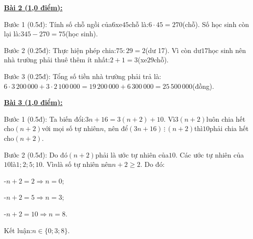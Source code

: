 \documentclass[11pt,a4paper]{article}
\begin{document}
\noindent\textbf{\underline{Bài 2 (1,0 điểm):}}\par\vspace{3pt}
Bước 1 (0.5đ): Tính số chỗ ngồi của$6$xe$45$chỗ là:$6 \cdot 45 = 270$(chỗ). Số học sinh còn lại là:$345 - 270 = 75$(học sinh).\par\noindent Bước 2 (0.25đ): Thực hiện phép chia:$75 : 29 = 2$(dư 17). Vì còn dư$17$học sinh nên nhà trường phải thuê thêm ít nhất:$2 + 1 = 3$(xe$29$chỗ).\par\noindent Bước 3 (0.25đ): Tổng số tiền nhà trường phải trả là:$6 \cdot 3\,200\,000 + 3 \cdot 2\,100\,000 = 19\,200\,000 + 6\,300\,000 = 25\,500\,000$(đồng).\par\vspace{8pt}

\noindent\textbf{\underline{Bài 3 (1,0 điểm):}}\par\vspace{3pt}
Bước 1 (0.5đ): Ta biến đổi:$3n + 16 = 3(n + 2) + 10$. Vì$3(n + 2)$luôn chia hết cho$(n + 2)$với mọi số tự nhiên$n$, nên để$(3n + 16) \,\vdots\, (n + 2)$thì$10$phải chia hết cho$(n + 2)$.\par\noindent Bước 2 (0.5đ): Do đó$(n + 2)$phải là ước tự nhiên của$10$. Các ước tự nhiên của$10$là$1; 2; 5; 10$. Vì$n$là số tự nhiên nên$n + 2 \ge 2$. Do đó:\par\noindent -$n + 2 = 2 \Rightarrow n = 0$;\par\noindent -$n + 2 = 5 \Rightarrow n = 3$;\par\noindent -$n + 2 = 10 \Rightarrow n = 8$.\par\noindent Kết luận:$n \in \{0; 3; 8\}$.\par\vspace{8pt}
\end{document}
